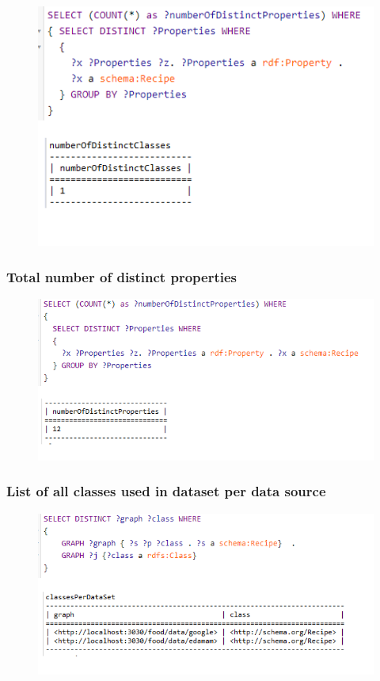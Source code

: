 \documentclass{article}
\begin{document}
\begin{figure}[H]
  \centering
  \includegraphics[width=12cm]{pictures/res3_dist_classes.png}
  \label{fig:qures3}
\end{figure}

\subsubsection{Total number of distinct properties}

\begin{figure}[H]
  \centering
  \includegraphics[width=12cm]{pictures/res4_dist_prop.png}
  \label{fig:qures4}
\end{figure}

\subsubsection{List of all classes used in dataset per data source}

\begin{figure}[H]
  \centering
  \includegraphics[width=12cm]{pictures/res5_classes_per_datasource.png}
  \label{fig:qures5}
\end{figure}
\end{document}
